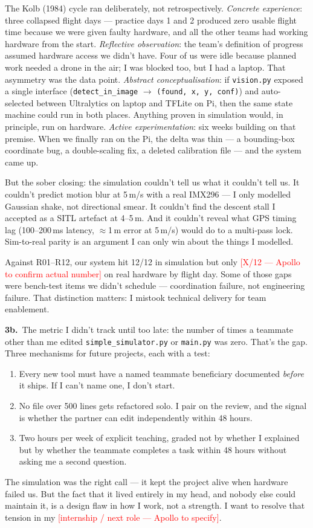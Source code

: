 The Kolb (1984) cycle ran deliberately, not retrospectively. \emph{Concrete experience}: three collapsed flight days --- practice days 1 and 2 produced zero usable flight time because we were given faulty hardware, and all the other teams had working hardware from the start. \emph{Reflective observation}: the team's definition of progress assumed hardware access we didn't have. Four of us were idle because planned work needed a drone in the air; I was blocked too, but I had a laptop. That asymmetry was the data point. \emph{Abstract conceptualisation}: if \texttt{vision.py} exposed a single interface (\texttt{detect\_in\_image} $\to$ \texttt{(found, x, y, conf)}) and auto-selected between Ultralytics on laptop and TFLite on Pi, then the same state machine could run in both places. Anything proven in simulation would, in principle, run on hardware. \emph{Active experimentation}: six weeks building on that premise. When we finally ran on the Pi, the delta was thin --- a bounding-box coordinate bug, a double-scaling fix, a deleted calibration file --- and the system came up.

But the sober closing: the simulation couldn't tell us what it couldn't tell us. It couldn't predict motion blur at 5\,m/s with a real IMX296 --- I only modelled Gaussian shake, not directional smear. It couldn't find the descent stall I accepted as a SITL artefact at 4--5\,m. And it couldn't reveal what GPS timing lag (100--200\,ms latency, $\approx$1\,m error at 5\,m/s) would do to a multi-pass lock. Sim-to-real parity is an argument I can only win about the things I modelled.

Against R01--R12, our system hit 12/12 in simulation but only \textcolor{red}{[X/12 --- Apollo to confirm actual number]} on real hardware by flight day. Some of those gaps were bench-test items we didn't schedule --- coordination failure, not engineering failure. That distinction matters: I mistook technical delivery for team enablement.

\textbf{3b.}~The metric I didn't track until too late: the number of times a teammate other than me edited \texttt{simple\_simulator.py} or \texttt{main.py} was zero. That's the gap. Three mechanisms for future projects, each with a test:

\begin{enumerate}[leftmargin=1.5em]
\item Every new tool must have a named teammate beneficiary documented \emph{before} it ships. If I can't name one, I don't start.
\item No file over 500 lines gets refactored solo. I pair on the review, and the signal is whether the partner can edit independently within 48 hours.
\item Two hours per week of explicit teaching, graded not by whether I explained but by whether the teammate completes a task within 48 hours without asking me a second question.
\end{enumerate}

The simulation was the right call --- it kept the project alive when hardware failed us. But the fact that it lived entirely in my head, and nobody else could maintain it, is a design flaw in how I work, not a strength. I want to resolve that tension in my \textcolor{red}{[internship / next role --- Apollo to specify]}.
